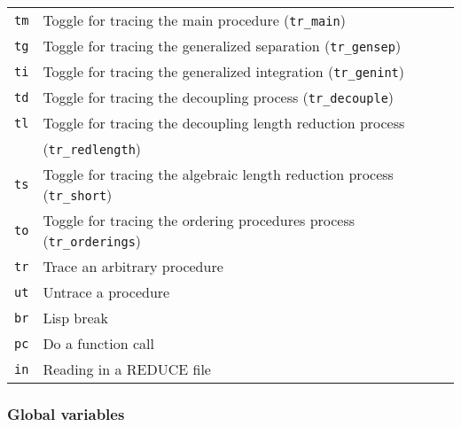 
\begin{longtable}[l]{ll}
  \texttt{tm} & Toggle for tracing the main procedure (\texttt{tr\_main}) \\
  \texttt{tg} & Toggle for tracing the generalized separation (\texttt{tr\_gensep}) \\
  \texttt{ti} & Toggle for tracing the generalized integration (\texttt{tr\_genint})  \\
  \texttt{td} & Toggle for tracing the decoupling process (\texttt{tr\_decouple}) \\
  \texttt{tl} & Toggle for tracing the decoupling length reduction process \\
  & (\texttt{tr\_redlength}) \\
  \texttt{ts} & Toggle for tracing the algebraic length reduction process (\texttt{tr\_short}) \\
  \texttt{to} & Toggle for tracing the ordering procedures process (\texttt{tr\_orderings}) \\
  \texttt{tr} & Trace an arbitrary procedure \\
  \texttt{ut} & Untrace a procedure \\
  \texttt{br} & Lisp break \\
  \texttt{pc} & Do a function call \\
  \texttt{in} & Reading in a REDUCE file
\end{longtable}

\subsubsection{Global variables}

